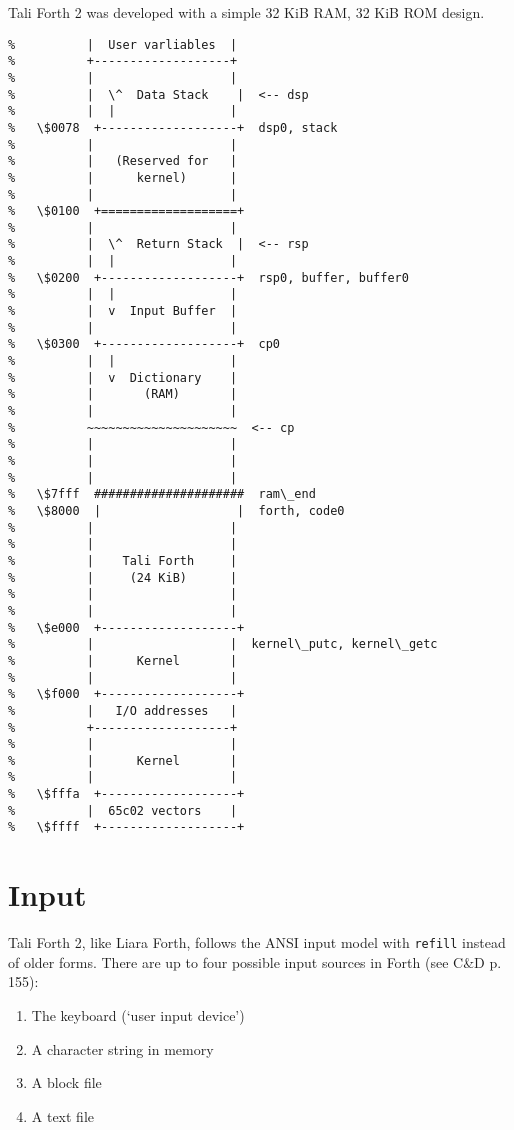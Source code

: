 Tali Forth 2 was developed with a simple 32 KiB RAM, 32 KiB ROM design. 

\begin{lstlisting}[frame=single]
%   \$0000  +-------------------+  ram\_start, zpage, user0
%          |  User varliables  |
%          +-------------------+  
%          |                   |
%          |  \^  Data Stack    |  <-- dsp
%          |  |                |
%   \$0078  +-------------------+  dsp0, stack
%          |                   |
%          |   (Reserved for   |
%          |      kernel)      |
%          |                   |
%   \$0100  +===================+  
%          |                   |
%          |  \^  Return Stack  |  <-- rsp 
%          |  |                |
%   \$0200  +-------------------+  rsp0, buffer, buffer0
%          |  |                |
%          |  v  Input Buffer  |
%          |                   |
%   \$0300  +-------------------+  cp0
%          |  |                |
%          |  v  Dictionary    |
%          |       (RAM)       |
%          |                   |
%          ~~~~~~~~~~~~~~~~~~~~~  <-- cp
%          |                   |
%          |                   |
%          |                   |
%   \$7fff  #####################  ram\_end
%   \$8000  |                   |  forth, code0
%          |                   |
%          |                   |
%          |    Tali Forth     |
%          |     (24 KiB)      |
%          |                   |
%          |                   |
%   \$e000  +-------------------+
%          |                   |  kernel\_putc, kernel\_getc   
%          |      Kernel       |
%          |                   |
%   \$f000  +-------------------+  
%          |   I/O addresses   |
%          +-------------------+     
%          |                   |
%          |      Kernel       |
%          |                   |
%   \$fffa  +-------------------+     
%          |  65c02 vectors    |
%   \$ffff  +-------------------+     
\end{lstlisting}


\section{Input}

Tali Forth 2, like Liara Forth, follows the ANSI input model with
\texttt{refill} instead of older forms. There are up to four possible input
sources in Forth (see C\&D p. 155):

\begin{enumerate}
        \item The keyboard (`user input device')
        \item A character string in memory
        \item A block file
        \item A text file
\end{enumerate}

